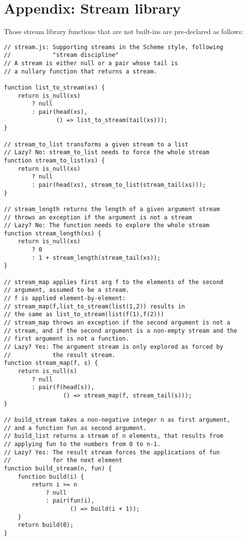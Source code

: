 \section*{Appendix: Stream library}

Those stream library functions that are not built-ins are pre-declared as follows:

\begin{lstlisting}
// stream.js: Supporting streams in the Scheme style, following
//            "stream discipline"
// A stream is either null or a pair whose tail is
// a nullary function that returns a stream.

function list_to_stream(xs) {
    return is_null(xs)
        ? null
        : pair(head(xs), 
               () => list_to_stream(tail(xs))); 
}

// stream_to_list transforms a given stream to a list
// Lazy? No: stream_to_list needs to force the whole stream
function stream_to_list(xs) {
    return is_null(xs)
        ? null
        : pair(head(xs), stream_to_list(stream_tail(xs)));
}

// stream_length returns the length of a given argument stream
// throws an exception if the argument is not a stream
// Lazy? No: The function needs to explore the whole stream
function stream_length(xs) {
    return is_null(xs)
        ? 0
        : 1 + stream_length(stream_tail(xs));
}

// stream_map applies first arg f to the elements of the second
// argument, assumed to be a stream.
// f is applied element-by-element:
// stream_map(f,list_to_stream(list(1,2)) results in
// the same as list_to_stream(list(f(1),f(2)))
// stream_map throws an exception if the second argument is not a
// stream, and if the second argument is a non-empty stream and the
// first argument is not a function.
// Lazy? Yes: The argument stream is only explored as forced by
//            the result stream.
function stream_map(f, s) {
    return is_null(s)
        ? null
        : pair(f(head(s)), 
                 () => stream_map(f, stream_tail(s)));
}

// build_stream takes a non-negative integer n as first argument,
// and a function fun as second argument.
// build_list returns a stream of n elements, that results from
// applying fun to the numbers from 0 to n-1.
// Lazy? Yes: The result stream forces the applications of fun
//            for the next element
function build_stream(n, fun) {
    function build(i) {
        return i >= n
            ? null
            : pair(fun(i), 
                   () => build(i + 1)); 
    }
    return build(0);
}


\end{lstlisting}
